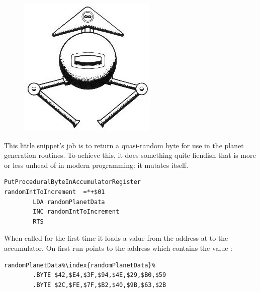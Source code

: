 \begin{definition}
\setlength{\intextsep}{0pt}%
\setlength{\columnsep}{3pt}%
\begin{figure}
\includegraphics[width=\linewidth]{src/callout/ia.jpg} 
\end{figure}
\small

This little snippet's job is to return a quasi-random byte for use in the planet generation
routines. To achieve this, it does something quite fiendish that is more or less unhead of in modern
programming: it mutates itself.

\begin{lstlisting}[caption=Neat.,escapechar=\%]
PutProceduralByteInAccumulatorRegister
randomIntToIncrement  =*+$01
        LDA randomPlanetData
        INC randomIntToIncrement
        RTS
\end{lstlisting}

When called for the first time it loads a value from the address at  to the accumulator. On first
run  points to the address  which contains the value :

\begin{lstlisting}[caption=Not Quite Random Bytes,escapechar=\%]
randomPlanetData%\index{randomPlanetData}%
        .BYTE $42,$E4,$3F,$94,$4E,$29,$B0,$59
        .BYTE $2C,$FE,$7F,$B2,$40,$9B,$63,$2B
\end{lstlisting}


\end{definition}
